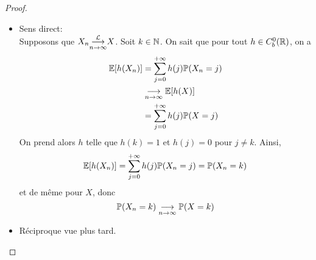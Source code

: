 \begin{proof}\,
    \begin{itemize}[\ptr{}]
        \item Sens direct:\\
        Supposons que \(X_n \underset{n\to\infty}{{\overset{\mathcal{L}}{\longrightarrow}}} X\). Soit \(k\in\mathbb{N}\). On sait que
        pour tout \(h\in C_b^0(\mathbb{R})\), on a
        \begin{equation*}
            \begin{aligned}
                \mathbb{E}[h(X_n)]
                &= \sum_{j=0}^{+\infty} h(j) \mathbb{P}(X_n = j)\\
                &\underset{n\to\infty}{\longrightarrow} \mathbb{E}[h(X)]\\
                &= \sum_{j=0}^{+\infty} h(j) \mathbb{P}(X = j)
            \end{aligned}
        \end{equation*}
        On prend alors \(h\) telle que \(h(k) = 1\) et \(h(j) = 0\) pour
        \(j\neq k\).
%
%
        Ainsi,
        \begin{equation*}
            \mathbb{E}[h(X_n)] = \sum_{j=0}^{+\infty} h(j) \mathbb{P}(X_n = j) = \mathbb{P}(X_n = k) 
        \end{equation*}
        et de même pour \(X\), donc
        \begin{equation*}
            \mathbb{P}(X_n = k) \underset{n\to\infty}{\longrightarrow} \mathbb{P}(X = k)
        \end{equation*}

        \item Réciproque vue plus tard.
    \end{itemize}
\end{proof}

